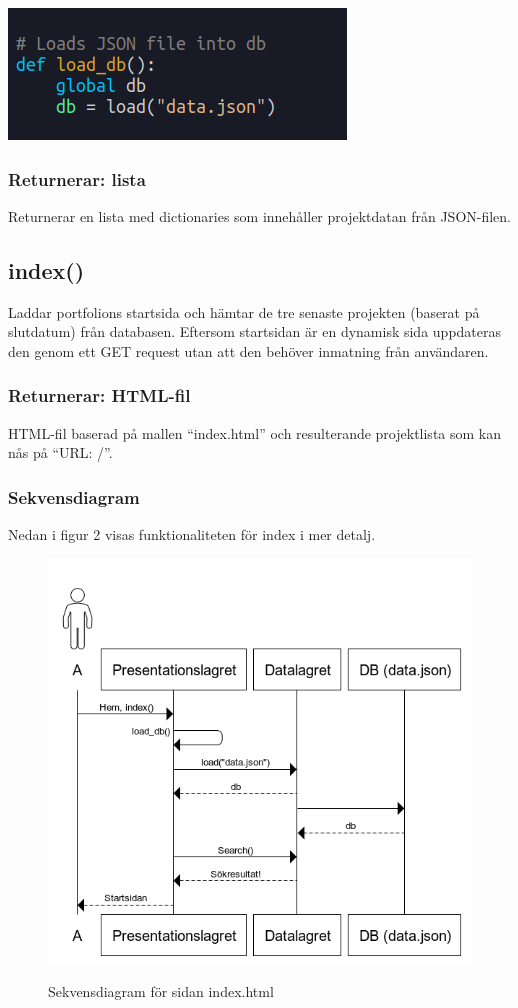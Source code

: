\documentclass{TDP003mall}
\begin{document}
\includegraphics[scale=0.5]{Images/load_db.png}

\subsubsection*{Returnerar: lista}
Returnerar en lista med dictionaries som innehåller projektdatan från JSON-filen.


\newpage
\subsection{index()}
Laddar portfolions startsida och hämtar de tre senaste projekten (baserat på slutdatum) från databasen. Eftersom startsidan är en dynamisk sida uppdateras den genom ett GET request
utan att den behöver inmatning från användaren.
\subsubsection*{Returnerar: HTML-fil}
HTML-fil baserad på mallen ``index.html'' och resulterande projektlista som kan nås på ``URL: /''. 
\subsubsection*{Sekvensdiagram}
Nedan i figur 2 visas funktionaliteten för index i mer detalj.
\begin{figure}[!h]
  \centering
  \includegraphics[scale=0.5]{index.png}
  \label{Bild 2}
  \caption{Sekvensdiagram för sidan index.html}
\end{figure}
\end{document}
